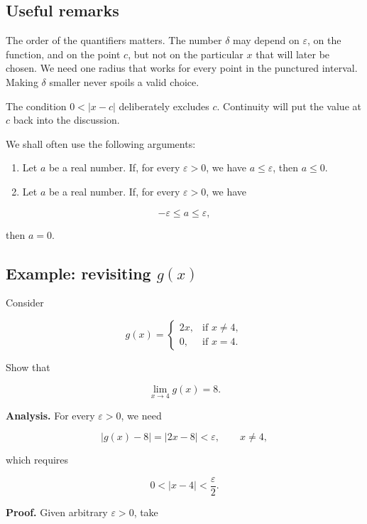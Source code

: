 \documentclass[11pt,a4paper]{article}
\begin{document}
\subsection{Useful remarks}\label{useful-remarks}

The order of the quantifiers matters. The number \(\delta\) may depend
on \(\varepsilon\), on the function, and on the point \(c\), but not on
the particular \(x\) that will later be chosen. We need one radius that
works for every point in the punctured interval. Making \(\delta\)
smaller never spoils a valid choice.

The condition \(0<|x-c|\) deliberately excludes \(c\). Continuity will
put the value at \(c\) back into the discussion.

We shall often use the following arguments:

\begin{enumerate}
\def\labelenumi{\arabic{enumi}.}
\item
  Let \(a\) be a real number. If, for every \(\varepsilon>0\), we have
  \(a\leq\varepsilon\), then \(a\leq0\).
\item
  Let \(a\) be a real number. If, for every \(\varepsilon>0\), we have
\end{enumerate}

\[
-\varepsilon\leq a\leq\varepsilon,
\]

then \(a=0\).

\subsection{\texorpdfstring{Example: revisiting
\(g(x)\)}{Example: revisiting g(x)}}\label{example-revisiting-gx}

Consider

\[
g(x)=
\begin{cases}
2x, & \text{if }x\ne4,\\
0, & \text{if }x=4.
\end{cases}
\]

Show that

\[
\lim_{x\to4}g(x)=8.
\]

\textbf{Analysis.} For every \(\varepsilon>0\), we need

\[
|g(x)-8|=|2x-8|<\varepsilon,
\qquad x\ne4,
\]

which requires

\[
0<|x-4|<\frac{\varepsilon}{2}.
\]

\textbf{Proof.} Given arbitrary \(\varepsilon>0\), take
\end{document}
